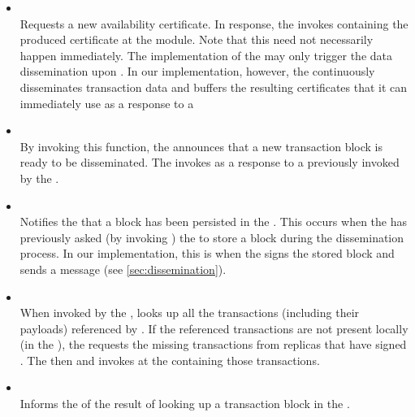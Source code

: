 \documentclass{article}
\begin{document}
\begin{itemize}

    \item {}\\
    Requests a new availability certificate.
    In response, the  invokes  containing the produced certificate at the  module.
    Note that this need not necessarily happen immediately.
    The implementation of the  may only trigger the data dissemination upon .
    In our implementation, however, the  continuously disseminates transaction data
    and buffers the resulting certificates that it can immediately use as a response to a 

    \item {}\\
    By invoking this function, the  announces that a new transaction block is ready to be disseminated.
    The  invokes  as a response
    to a  previously invoked by the .

    \item {}\\
    Notifies the  that a block has been persisted in the .
    This occurs when the  has previously asked (by invoking )
    the  to store a block during the dissemination process.
    In our implementation, this is when the  signs the stored block and sends a  message (see \cref{sec:dissemination}).

    \item {}\\
    When invoked by the ,  looks up all the transactions (including their payloads) referenced by .
    If the referenced transactions are not present locally (in the ),
    the  requests the missing transactions from replicas that have signed .
    The  then and invokes  at the  containing those transactions.
    
    \item {}\\
    Informs the  of the result of looking up a transaction block in the .

\end{itemize}
\end{document}
